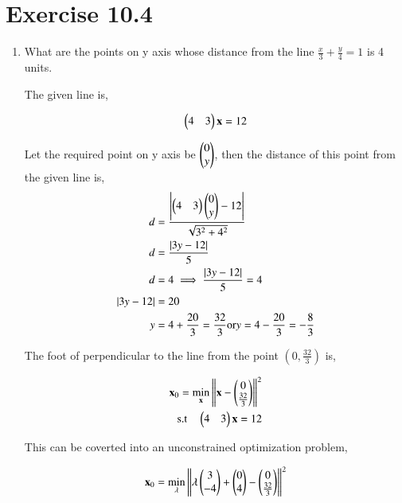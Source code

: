\documentclass[journal,12pt,twocolumn]{IEEEtran}
\begin{document}
\section{Exercise 10.4}
\begin{enumerate}
	\item What are the points on y axis whose distance from the line $\frac{x}{3}+\frac{y}{4}=1$ is 4 units.
	
		The given line is,

		\begin{align}
			\begin{pmatrix}4 & 3\end{pmatrix}\mathbf{x} = 12
		\end{align}

		Let the required point on y axis be $\begin{pmatrix}0\\y\end{pmatrix}$, then the distance of this point from the given line is,   
		\begin{align}
			d &= \frac{\left\vert\begin{pmatrix}4 & 3\end{pmatrix}\begin{pmatrix}0\\y\end{pmatrix}-12\right\vert}{\sqrt{3^2+4^2}}\\
			d &= \frac{\left\vert3y-12\right\vert}{5}\\
			d &= 4 \implies \frac{\left\vert3y-12\right\vert}{5} = 4\\
			\left\vert3y-12\right\vert &= 20\\
			y &= 4 + \frac{20}{3}=\frac{32}{3} \text{or} y = 4 - \frac{20}{3}=-\frac{8}{3}\\
		\end{align}

The foot of perpendicular to the line from the point $(0,\frac{32}{3})$ is,

		\begin{align}
			\mathbf{x}_0 = \min_{\mathbf{x}} \left\lVert\mathbf{x}-\begin{pmatrix}0\\\frac{32}{3}\end{pmatrix}\right\rVert^2\\
			\text{s.t} \quad \begin{pmatrix}4 & 3\end{pmatrix}\mathbf{x} = 12
		\end{align}

This can be coverted into an unconstrained optimization problem,
	
		\begin{align}
			\mathbf{x}_0 = \min_{\mathbf{\lambda}} \left\lVert\lambda \begin{pmatrix}3\\-4\end{pmatrix}+\begin{pmatrix}0\\4\end{pmatrix}-\begin{pmatrix}0\\\frac{32}{3}\end{pmatrix}\right\rVert^2\\
		\end{align}


\end{enumerate}
\end{document}

